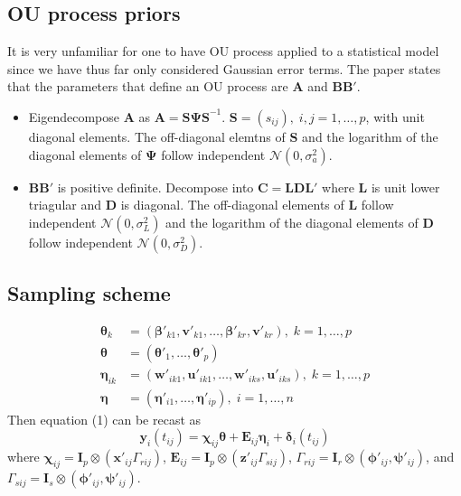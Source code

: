 \documentclass[11pt]{article}
\newcommand{\bs}{\boldsymbol}
\begin{document}
\subsection{OU process priors}
It is very unfamiliar for one to have OU process applied to a statistical model since we have thus far only considered Gaussian error terms. The paper states that the parameters that define an OU process are $\bs{A}$ and $\bs{BB}'$.
\begin{itemize}
  \item Eigendecompose $\bs{A}$ as $\bs{A} = \bs{S\Psi S}^{-1}$. $\bs{S} = \left(s_{ij}\right), \; i,j=1,\ldots , p$, with unit diagonal elements. The off-diagonal elemtns of $\bs{S}$ and the logarithm of the diagonal elements of $\bs{\Psi}$ follow independent $\mathcal{N}\left(0, \sigma_{a}^{2}\right)$.
  \item $\bs{BB}'$ is positive definite. Decompose into $\bs{C}=\bs{LDL}'$ where $\bs{L}$ is unit lower triagular and $\bs{D}$ is diagonal. The off-diagonal elements of $\bs{L}$ follow independent $\mathcal{N}\left(0,\sigma_{L}^{2}\right)$ and the logarithm of the diagonal elements of $\bs{D}$ follow independent $\mathcal{N}\left(0,\sigma_{D}^{2}\right)$.
\end{itemize}
\subsection{Sampling scheme}
\begin{align}
  \bs{\theta}_{k} &= \left(\bs{\beta}'_{k1}, \bs{v}'_{k1}, \ldots , \bs{\beta}'_{kr}, \bs{v}'_{kr}\right), \; k=1,\ldots , p\\
  \bs{\theta} &= \left(\bs{\theta}'_{1},\ldots , \bs{\theta}'_{p}\right)\\
  \bs{\eta}_{ik} &= \left(\bs{w}'_{ik1}, \bs{u}'_{ik1}, \ldots , \bs{w}'_{iks},\bs{u}'_{iks}\right), \; k=1,\ldots , p\\
  \bs{\eta} &= \left(\bs{\eta}'_{i1}, \ldots , \bs{\eta}'_{ip}\right), \; i=1,\ldots , n
\end{align}
Then equation (1) can be recast as
\begin{equation}
  \bs{y}_{i}\left(t_{ij}\right) = \bs{\chi}_{ij}\bs{\theta} + \bs{E}_{ij}\bs{\eta}_{i} + \bs{\delta}_{i}\left(t_{ij}\right)
\end{equation}
where $\bs{\chi}_{ij}=\bs{I}_{p} \otimes \left(\bs{x}'_{ij}\Gamma_{rij}\right)$, $\bs{E}_{ij}=\bs{I}_{p}\otimes \left(\bs{z}'_{ij}\Gamma_{sij}\right)$, $\Gamma_{rij}=\bs{I}_{r} \otimes \left(\bs{\phi}'_{ij}, \bs{\psi}'_{ij}\right)$, and $\Gamma_{sij}=\bs{I}_{s} \otimes \left(\bs{\phi}'_{ij}, \bs{\psi}'_{ij}\right)$.
\end{document}
